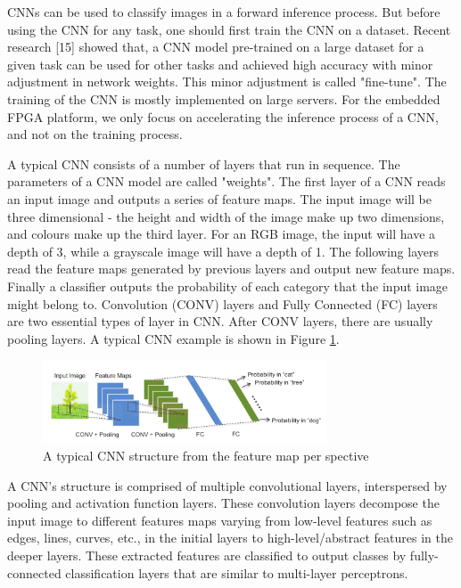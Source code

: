 \documentclass[11pt]{article}
\begin{document}
CNNs can be used to classify images in a forward inference process. But before using the CNN for any task, one should first train the CNN on a dataset. Recent research [15] showed that, a CNN model pre-trained on a large dataset for a given task can be used for other tasks and achieved high accuracy with minor adjustment in network weights. This minor adjustment is called "fine-tune". The training of the CNN is mostly implemented on large servers. For the embedded FPGA platform, we only focus on accelerating the inference process of a CNN, and not on the training process.

A typical CNN consists of a number of layers that run in sequence. The parameters of a CNN model are called "weights". The first layer of a CNN reads an input image and outputs a series of feature maps. The input image will be three dimensional - the height and width of the image make up two dimensions, and colours make up the third layer. For an RGB image, the input will have a depth of 3, while a grayscale image will have a depth of 1. The following layers read the feature maps generated by previous layers and output new feature maps. Finally a classifier outputs the probability of each category that the input image might belong to. Convolution (CONV) layers and Fully Connected (FC) layers are two essential types of layer in CNN. After CONV layers, there are usually pooling layers. A typical CNN example is shown in Figure \ref{fig:typicalCNN}.

\begin{figure}

\centering
\includegraphics[width=0.75\textwidth]{../figures/typicalCnn}

  \caption{A typical CNN structure from the feature map per
spective \label{fig:typicalCNN}}

\end{figure}

A CNN's structure is comprised of multiple convolutional layers, interspersed by pooling and activation function layers. These convolution layers decompose the input image to different features maps varying from low-level features such as edges, lines, curves, etc., in the initial layers to high-level/abstract features in the deeper layers. These extracted features are classified to output classes by fully-connected classification layers that are similar to multi-layer perceptrons.
\end{document}
